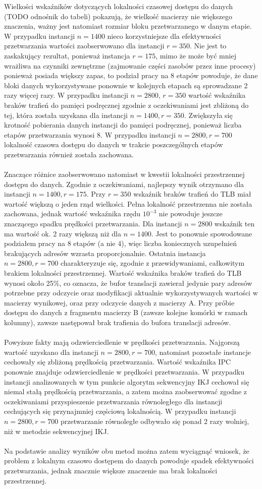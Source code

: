 \documentclass[12pt,a4paper]{article}
\begin{document}
Wielkości wskaźników dotyczących lokalności czasowej dostępu do danych (TODO odnośnik do tabeli) pokazują, że wielkość macierzy nie większego znaczenia, ważny jest natomiast rozmiar bloku przetwarzanego w danym etapie. W przypadku instancji $n=1400$ nieco korzystniejsze dla efektywności przetwarzania wartości zaobserwowano dla instancji $r=350$. Nie jest to zaskakujący rezultat, ponieważ instancja $r=175$, mimo że może być mniej wrażliwa na czynniki zewnętrzne (zajmowanie części zasobów przez inne procesy) ponieważ posiada większy zapas, to podział pracy na 8 etapów powoduje, że dane bloki danych wykorzystywane ponownie w kolejnych etapach są sprowadzane 2 razy więcej razy. W przypadku instancji $n=2800$, $r=350$ wartość wskaźnika braków trafień do pamięci podręcznej zgodnie z oczekiwaniami jest zbliżoną do tej, która została uzyskana dla instancji $n=1400, r=350$. Zwiększyła się krotność pobierania danych instancji do pamięci podręcznej, ponieważ liczba etapów  przetwarzania wynosi 8. W przypadku instancji $n=2800, r=700$ lokalność czasowa dostępu do danych w trakcie poszczególnych etapów przetwarzania również została zachowana.\\
\\
Znaczące różnice zaobserwowano natomiast w kwestii lokalności przestrzennej dostępu do danych. Zgodnie z oczekiwaniami, najlepszy wynik otrzymano dla instancji $n=1400, r=175$. Przy $r=350$ wskaźnik braków trafień do TLB miał wartość większą o jeden rząd wielkości. Pełna lokalność przestrzenna nie została zachowana, jednak wartość wskaźnika rzędu $10^{-3}$ nie powoduje jeszcze znaczącego spadku prędkości przetwarzania. Dla instancji $n=2800$ wskaźnik ten ma wartość ok. 2 razy większą niż dla $n=1400$. Jest to ponownie spowodowane podziałem pracy na 8 etapów (a nie 4), więc liczba koniecznych uzupełnień brakujących adresów wzrasta proporcjonalnie.
Ostatnia instancja $n=2800, r=700$ charakteryzuje się, zgodnie z przewidywaniami, całkowitym brakiem lokalności przestrzennej. Wartość wskaźnika braków trafień do TLB wynosi około 25\%, co oznacza, że bufor translacji zawierał jedynie pary adresów potrzebne przy odczycie oraz modyfikacji aktualnie wykorzystywanych wartości w macierzy wynikowej, oraz przy odczycie danych z macierzy A. Przy próbie dostępu do danych z fragmentu macierzy B (zawsze kolejne komórki w ramach kolumny), zawsze następował brak trafienia do bufora translacji adresów.\\
\\
Powyższe fakty mają odzwierciedlenie w prędkości przetwarzania. Najgorszą wartość uzyskano dla instancji $n=2800, r=700$, natomiast pozostałe instancje cechowały się zbliżoną prędkością przetwarzania. Wartość wskaźnika IPC ponownie znajduje odzwierciedlenie w prędkości przetwarzania. W przypadku instancji analizowanych w tym punkcie algorytm sekwencyjny IKJ cechował się niemal stałą prędkością przetwarzania, a zatem można zaobserwować zgodne z oczekiwaniami przyspieszenie przetwarzania równoległego dla instancji cechujących się przynajmniej częściową lokalnością. W przypadku instancji $n=2800, r=700$ przetwarzanie równoległe odbywało się ponad 2 razy wolniej, niż w metodzie sekwencyjnej IKJ.\\
\\
Na podstawie analizy wyników obu metod można zatem wyciągnąć wniosek, że problem z lokalnym czasowo dostępem do danych powoduje spadek efektywności przetwarzania, jednak znacznie większe znaczenie ma brak lokalności przestrzennej.
\end{document}
